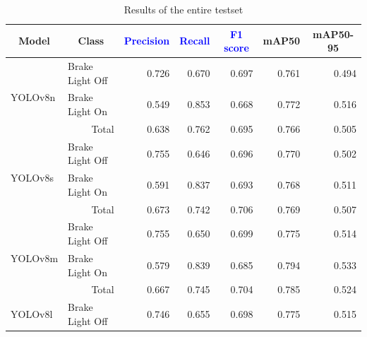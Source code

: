 \begin{table}[!h]
    \caption{Results of the entire testset}
    \label{tab:total}
    \begin{tabular}{llrrrrr}
    \toprule
    \multicolumn{1}{c}{Model} & \multicolumn{1}{c}{Class} & \multicolumn{1}{c}{\textcolor{blue}{Precision}} & \multicolumn{1}{c}{\textcolor{blue}{Recall}} & \multicolumn{1}{c}{\textcolor{blue}{F1 score}} & \multicolumn{1}{c}{mAP50} & \multicolumn{1}{c}{mAP50-95} \\
    \midrule
    \multirow{3}{*}{YOLOv8n}  & Brake Light Off           & 0.726 & 0.670 & 0.697 & 0.761                     & 0.494                          \\
                              & Brake Light On            & 0.549 & 0.853 & 0.668 & 0.772                     & 0.516                        \\
                              & \multicolumn{1}{r}{Total} & 0.638 & 0.762 & 0.695 & 0.766                     & 0.505                        \\
    \midrule
    \multirow{3}{*}{YOLOv8s}  & Brake Light Off           & 0.755 & 0.646 & 0.696 & 0.770                     & 0.502                        \\
                              & Brake Light On            & 0.591 & 0.837 & 0.693 & 0.768                     & 0.511                        \\
                              & \multicolumn{1}{r}{Total} & 0.673 & 0.742 & 0.706 & 0.769                     & 0.507                        \\
    \midrule
    \multirow{3}{*}{YOLOv8m}  & Brake Light Off           & 0.755 & 0.650 & 0.699 & 0.775                     & 0.514                         \\
                              & Brake Light On            & 0.579 & 0.839 & 0.685 & 0.794                     & 0.533                        \\
                              & \multicolumn{1}{r}{Total} & 0.667 & 0.745 & 0.704 & 0.785                     & 0.524                        \\
    \midrule
    \multirow{3}{*}{YOLOv8l}  & Brake Light Off           & 0.746 & 0.655 & 0.698 & 0.775                     & 0.515                         \\

\end{tabular}
\end{table}
